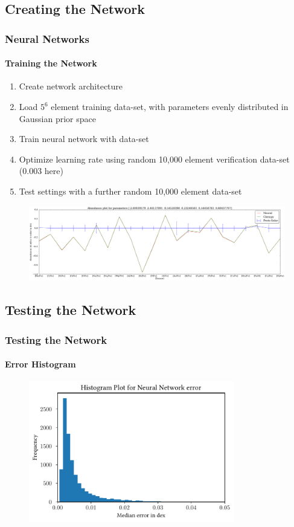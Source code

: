 \documentclass{beamer}
\begin{document}
\subsection{Creating the Network}
\begin{frame}
\frametitle{Neural Networks}
\framesubtitle{Training the Network}
\begin{enumerate}
\item Create network architecture
\item Load $5^6$ element training data-set, with parameters evenly distributed in Gaussian prior space
\item Train neural network with data-set
\item Optimize learning rate using random 10,000 element verification data-set (0.003 here)
\item Test settings with a further random 10,000 element data-set
\end{enumerate}
\begin{figure}
\centering
\includegraphics[width=\textwidth]{neural_abundances.png}
\end{figure}
\end{frame}

\subsection{Testing the Network}
\begin{frame}
\frametitle{Testing the Network}
\framesubtitle{Error Histogram}
\begin{figure}
\centering
\includegraphics[width=0.8\textwidth]{neural_hist.pdf}
\end{figure}
\end{frame}
\end{document}
